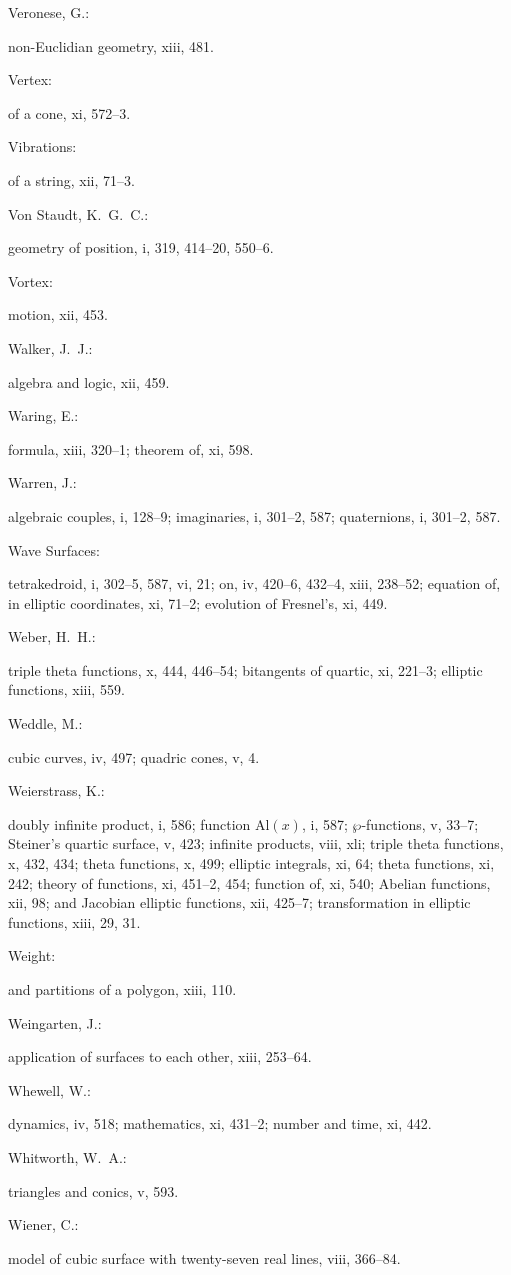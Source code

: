\documentclass[11pt,a4paper]{book}
\providecommand{\V}[1]{#1}
\providecommand{\IndexEntry}[2]{#1\dotfill #2\par}
\begin{document}
\IndexEntry{Veronese, G.}: non-Euclidian geometry, \V{xiii}, 481.

\IndexEntry{Vertex}: of a cone, \V{xi}, 572--3.

\IndexEntry{Vibrations}: of a string, \V{xii}, 71--3.

\IndexEntry{Von Staudt, K.\ G.\ C.}: geometry of position, \V{i}, 319, 414--20, 550--6.

\IndexEntry{Vortex}: motion, \V{xii}, 453.

\IndexEntry{Walker, J.\ J.}: algebra and logic, \V{xii}, 459.

\IndexEntry{Waring, E.}: formula, \V{xiii}, 320--1; theorem of, \V{xi}, 598.

\IndexEntry{Warren, J.}: algebraic couples, \V{i}, 128--9; imaginaries, \V{i}, 301--2, 587; quaternions, \V{i}, 301--2, 587.

\IndexEntry{Wave Surfaces}: tetrakedroid, \V{i}, 302--5, 587, \V{vi}, 21; on, \V{iv}, 420--6, 432--4, \V{xiii}, 238--52; equation of, in elliptic coordinates, \V{xi}, 71--2; evolution of Fresnel's, \V{xi}, 449.

\IndexEntry{Weber, H.\ H.}: triple theta functions, \V{x}, 444, 446--54; bitangents of quartic, \V{xi}, 221--3; elliptic functions, \V{xiii}, 559.

\IndexEntry{Weddle, M.}: cubic curves, \V{iv}, 497; quadric cones, \V{v}, 4.

\IndexEntry{Weierstrass, K.}: doubly infinite product, \V{i}, 586; function Al$(x)$, \V{i}, 587; $\wp$-functions, \V{v}, 33--7; Steiner's quartic surface, \V{v}, 423; infinite products, \V{viii}, xli; triple theta functions, \V{x}, 432, 434; theta functions, \V{x}, 499; elliptic integrals, \V{xi}, 64; theta functions, \V{xi}, 242; theory of functions, \V{xi}, 451--2, 454; function of, \V{xi}, 540; Abelian functions, \V{xii}, 98; and Jacobian elliptic functions, \V{xii}, 425--7; transformation in elliptic functions, \V{xiii}, 29, 31.

\IndexEntry{Weight}: and partitions of a polygon, \V{xiii}, 110.

\IndexEntry{Weingarten, J.}: application of surfaces to each other, \V{xiii}, 253--64.

\IndexEntry{Whewell, W.}: dynamics, \V{iv}, 518; mathematics, \V{xi}, 431--2; number and time, \V{xi}, 442.

\IndexEntry{Whitworth, W.\ A.}: triangles and conics, \V{v}, 593.

\IndexEntry{Wiener, C.}: model of cubic surface with twenty-seven real lines, \V{viii}, 366--84.
\end{document}
